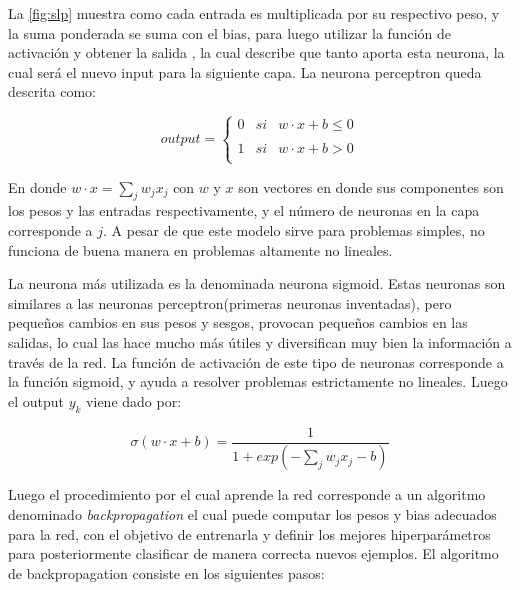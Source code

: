 La \autoref{fig:slp} muestra como cada entrada es multiplicada por su respectivo peso, y la suma ponderada se suma con el bias, para luego utilizar la función de activación y obtener la salida , la cual describe que tanto aporta esta neurona, la cual será el nuevo input para la siguiente capa. La neurona perceptron queda descrita como:

\begin{equation}
output = \left\{ \begin{array}{lcc}
             0 &   si  & w \cdot x + b \leq 0 \\
             \\ 1 &  si & w \cdot x + b > 0 \\
             \end{array} \right.
\end{equation}

En donde $ w\cdot x = \sum_{j} w_{j} x_{j} $ con $w$ y $x$ son vectores en donde sus componentes son los pesos y las entradas respectivamente, y el número de neuronas en la capa corresponde a $j$. A pesar de que este modelo sirve para problemas simples, no funciona de buena manera en problemas altamente no lineales. 

La neurona más utilizada es la denominada neurona sigmoid. Estas neuronas son similares a las neuronas perceptron(primeras neuronas inventadas), pero pequeños cambios en sus pesos y sesgos, provocan pequeños cambios en las salidas, lo cual las hace mucho más útiles y diversifican muy bien la información a través de la red. La función de activación de este tipo de neuronas corresponde a la función sigmoid, y ayuda a resolver problemas estrictamente no lineales. Luego el output $y_{k}$ viene dado por:


\begin{equation} \sigma( w \cdot x + b) = \frac{1}{1 + exp(- \sum_{j} w_{j}x_{j} - b )} \end{equation}

Luego el procedimiento por el cual aprende la red corresponde a un algoritmo denominado \textit{backpropagation} el cual puede computar los pesos y bias adecuados para la red, con el objetivo de entrenarla y definir los mejores hiperparámetros para posteriormente clasificar de manera correcta nuevos ejemplos. El algoritmo de backpropagation consiste en los siguientes pasos:

